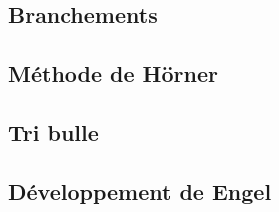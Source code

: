 

\subsection{Branchements}

\subsection{Méthode de Hörner}

\subsection{Tri bulle}

\subsection{Développement de Engel}

